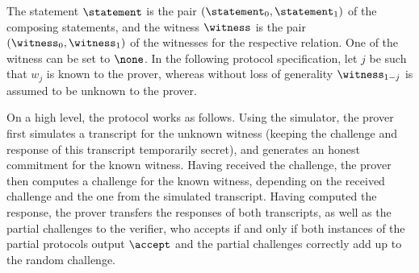 \documentclass[11pt]{article}
\begin{document}
The statement $\statement$ is the pair $(\statement_0, \statement_1)$ of the composing statements, and the witness $\witness$ is the pair $(\witness_0, \witness_1)$ of the witnesses for the respective relation. One of the witness can be set to $\none$.
  In the following protocol specification, let $j$ be such that $w_j$ is known to the prover, whereas without loss of generality $\witness_{1-j}$ is assumed to be unknown to the prover.

	On a high level, the protocol works as follows.
	Using the simulator, the prover first simulates a transcript for the unknown witness (keeping the challenge and response of this transcript temporarily secret), and generates an honest commitment for the known witness.
	Having received the challenge, the prover then computes a challenge for the known witness, depending on the received challenge and the one from the simulated transcript.
	Having computed the response, the prover transfers the responses of both transcripts, as well as the partial challenges to the verifier, who accepts if and only if both instances of the partial protocols output $\accept$ and the partial challenges correctly add up to the random challenge.
\end{document}
